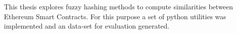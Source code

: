 
This thesis explores fuzzy hashing methods to compute similarities between Ethereum Smart Contracts.
For this purpose a set of python utilities was implemented and an data-set for evaluation generated.
